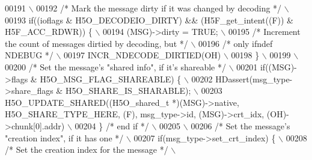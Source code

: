 \begin{DoxyCode}
00191 \textcolor{preprocessor}{                                                                              \(\backslash\)}
00192 \textcolor{preprocessor}{        }\textcolor{comment}{/* Mark the message dirty if it was changed by decoding */}\textcolor{preprocessor}{            \(\backslash\)}
00193 \textcolor{preprocessor}{        if((ioflags & H5O\_DECODEIO\_DIRTY) && (H5F\_get\_intent((F)) & H5F\_ACC\_RDWR)) \{ \(\backslash\)}
00194 \textcolor{preprocessor}{            (MSG)->dirty = TRUE;                                              \(\backslash\)}
00195 \textcolor{preprocessor}{            }\textcolor{comment}{/* Increment the count of messages dirtied by decoding, but */}\textcolor{preprocessor}{    \(\backslash\)}
00196 \textcolor{preprocessor}{            }\textcolor{comment}{/* only ifndef NDEBUG */}\textcolor{preprocessor}{                                          \(\backslash\)}
00197 \textcolor{preprocessor}{            INCR\_NDECODE\_DIRTIED(OH)                                          \(\backslash\)}
00198 \textcolor{preprocessor}{        \}                                                                     \(\backslash\)}
00199 \textcolor{preprocessor}{                                                                              \(\backslash\)}
00200 \textcolor{preprocessor}{        }\textcolor{comment}{/* Set the message's "shared info", if it's shareable */}\textcolor{preprocessor}{          \(\backslash\)}
00201 \textcolor{preprocessor}{        if((MSG)->flags & H5O\_MSG\_FLAG\_SHAREABLE) \{                           \(\backslash\)}
00202 \textcolor{preprocessor}{            HDassert(msg\_type->share\_flags & H5O\_SHARE\_IS\_SHARABLE);          \(\backslash\)}
00203 \textcolor{preprocessor}{            H5O\_UPDATE\_SHARED((H5O\_shared\_t *)(MSG)->native, H5O\_SHARE\_TYPE\_HERE, (F), msg\_type->id,
       (MSG)->crt\_idx, (OH)->chunk[0].addr) \(\backslash\)}
00204 \textcolor{preprocessor}{        \} }\textcolor{comment}{/* end if */}\textcolor{preprocessor}{                                                        \(\backslash\)}
00205 \textcolor{preprocessor}{                                                                              \(\backslash\)}
00206 \textcolor{preprocessor}{        }\textcolor{comment}{/* Set the message's "creation index", if it has one */}\textcolor{preprocessor}{           \(\backslash\)}
00207 \textcolor{preprocessor}{        if(msg\_type->set\_crt\_index) \{                             \(\backslash\)}
00208 \textcolor{preprocessor}{            }\textcolor{comment}{/* Set the creation index for the message */}\textcolor{preprocessor}{              \(\backslash\)}

\end{DoxyCode}
